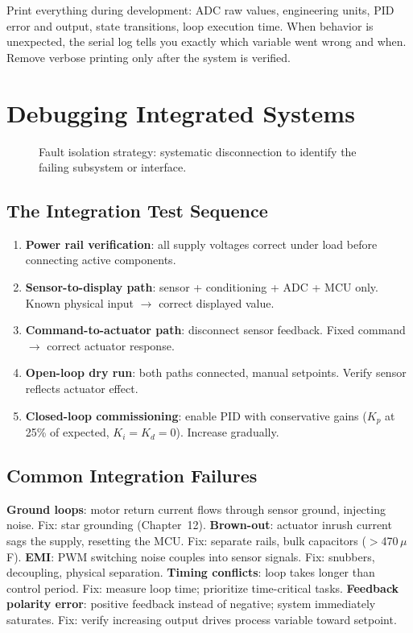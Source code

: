 \begin{tipbox}[Serial Monitor = Oscilloscope for Code]
Print everything during development: ADC raw values, engineering units, PID error and output, state transitions, loop execution time. When behavior is unexpected, the serial log tells you exactly which variable went wrong and when. Remove verbose printing only after the system is verified.
\end{tipbox}

\section{Debugging Integrated Systems}

\begin{figure}[htbp]\centering

\caption{Fault isolation strategy: systematic disconnection to identify the failing subsystem or interface.}\label{fig:fault_isolation}\end{figure}

\subsection{The Integration Test Sequence}
\begin{enumerate}[leftmargin=1.5em]
\item \textbf{Power rail verification}: all supply voltages correct under load before connecting active components.
\item \textbf{Sensor-to-display path}: sensor + conditioning + ADC + MCU only. Known physical input $\to$ correct displayed value.
\item \textbf{Command-to-actuator path}: disconnect sensor feedback. Fixed command $\to$ correct actuator response.
\item \textbf{Open-loop dry run}: both paths connected, manual setpoints. Verify sensor reflects actuator effect.
\item \textbf{Closed-loop commissioning}: enable PID with conservative gains ($K_p$ at 25\% of expected, $K_i = K_d = 0$). Increase gradually.
\end{enumerate}

\subsection{Common Integration Failures}
\textbf{Ground loops}: motor return current flows through sensor ground, injecting noise. Fix: star grounding (Chapter~12). \textbf{Brown-out}: actuator inrush current sags the supply, resetting the MCU. Fix: separate rails, bulk capacitors ($>$470\,$\mu$F). \textbf{EMI}: PWM switching noise couples into sensor signals. Fix: snubbers, decoupling, physical separation. \textbf{Timing conflicts}: loop takes longer than control period. Fix: measure loop time; prioritize time-critical tasks. \textbf{Feedback polarity error}: positive feedback instead of negative; system immediately saturates. Fix: verify increasing output drives process variable toward setpoint.

